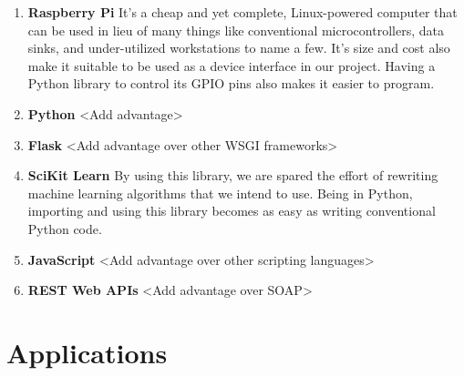 \begin{enumerate}

\begin{comment}
\item \textbf{Machine Learning}
It is central to the functioning of any system that is based on learning complex models that often change dynamically, thus rendering hard coding of such models difficult if not impossible. Machine learning overcomes this hurdle by analyzing the model and trying to detect any patterns in it. Any changes in the pattern can also be detected by the system and the system can respond to it suitably.
\end{comment}

\item \textbf{Raspberry Pi}
It's a cheap and yet complete, Linux-powered computer that can be used in lieu of many things like conventional microcontrollers, data sinks, and under-utilized workstations to name a few. It's size and cost also make it suitable to be used as a device interface in our project. Having a Python library to control its GPIO pins also makes it easier to program.

\item \textbf{Python}
<Add advantage>

\item \textbf{Flask}
<Add advantage over other WSGI frameworks>

\item \textbf{SciKit Learn}
By using this library, we are spared the effort of rewriting machine learning algorithms that we intend to use. Being in Python, importing and using this library becomes as easy as writing conventional Python code.

\item \textbf{JavaScript}
<Add advantage over other scripting languages>

\item \textbf{REST Web APIs}
<Add advantage over SOAP>
\end{enumerate}

\section{Applications}

